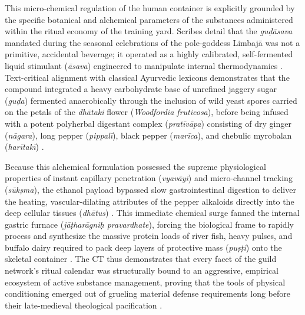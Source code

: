 \documentclass[11pt,twoside,letterpaper]{article}
\begin{document}
This micro-chemical regulation of the human container is explicitly grounded by the specific botanical and alchemical parameters of the substances administered within the ritual economy of the training yard. Scribes detail that the \textit{guḍāsava} mandated during the seasonal celebrations of the pole-goddess Limbajā was not a primitive, accidental beverage; it operated as a highly calibrated, self-fermented liquid stimulant (\textit{āsava}) engineered to manipulate internal thermodynamics \citep{Sandesara1948}. Text-critical alignment with classical Ayurvedic lexicons demonstrates that the compound integrated a heavy carbohydrate base of unrefined jaggery sugar (\textit{guḍa}) fermented anaerobically through the inclusion of wild yeast spores carried on the petals of the \textit{dhātaki} flower (\textit{Woodfordia fruticosa}), before being infused with a potent polyherbal digestant complex (\textit{pratīvāpa}) consisting of dry ginger (\textit{nāgara}), long pepper (\textit{pippalī}), black pepper (\textit{marīca}), and chebulic myrobalan (\textit{harītakī}) \citep{MP_7, Sandesara1948}. 

Because this alchemical formulation possessed the supreme physiological properties of instant capillary penetration (\textit{vyavāyī}) and micro-channel tracking (\textit{sūkṣma}), the ethanol payload bypassed slow gastrointestinal digestion to deliver the heating, vascular-dilating attributes of the pepper alkaloids directly into the deep cellular tissues (\textit{dhātus}) \citep{Wujastyk2025}. This immediate chemical surge fanned the internal gastric furnace (\textit{jāṭharāgniḥ pravardhate}), forcing the biological frame to rapidly process and synthesize the massive protein loads of river fish, heavy pulses, and buffalo dairy required to pack deep layers of protective mass (\textit{puṣṭi}) onto the skeletal container \citep{MP_7}. The CT thus demonstrates that every facet of the guild network's ritual calendar was structurally bound to an aggressive, empirical ecosystem of active substance management, proving that the tools of physical conditioning emerged out of grueling material defense requirements long before their late-medieval theological pacification \citep{MP_7, Sandesara1948, Wujastyk2025}.
\end{document}
